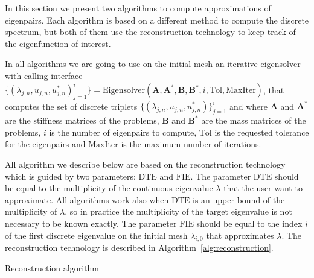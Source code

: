 \documentclass[smallextended]{svjour3}
\begin{document}
In this section we present two algorithms to compute approximations of eigenpairs. Each algorithm is based on a different method to compute the discrete spectrum, but both of them use the reconstruction technology to keep track of the eigenfunction of interest.

In all algorithms we are going to use on the initial mesh an iterative eigensolver with calling interface
$\{(\lambda_{j,n},u_{j,n},u_{j,n}^*)_{j=1}^{i}\}=\mathrm{Eigensolver}(\mathbf{A},
\mathbf{A}^*,\mathbf{B},\mathbf{B}^*,i,\mathrm{Tol},\mathrm{MaxIter})$, that computes the set of discrete triplets $\{(\lambda_{j,n},u_{j,n},u_{j,n}^*)\}_{j=1}^{i}$ and where $\mathbf{A}$ and $\mathbf{A}^*$ are the stiffness matrices of the problems, $\mathbf{B}$ and $\mathbf{B}^*$ are the mass matrices of the problems, $i$ is the number of eigenpairs to compute, $\mathrm{Tol}$ is the requested tolerance for the eigenpairs and $\mathrm{MaxIter}$ is the maximum number of iterations. 


All algorithm we describe below are based on the reconstruction technology which is guided by two parameters: $\mathrm{DTE}$ and $\mathrm{FIE}$. The parameter $\mathrm{DTE}$ should be equal to the multiplicity of the continuous eigenvalue $\lambda$ that the user want to approximate. All algorithms work also when $\mathrm{DTE}$ is an upper bound of the multiplicity of $\lambda$, so in practice the multiplicity of the target eigenvalue is not necessary to be known exactly. The parameter $\mathrm{FIE}$ should be equal to the index $i$ of the first discrete eigenvalue on the initial mesh $\lambda_{i,0}$ that approximates $\lambda$. The reconstruction technology is described in Algorithm~\eqref{alg:reconstruction}.

\begin{algorithm}[!ht] \caption{Reconstruction algorithm} \label{alg:reconstruction} 
\begin{algorithmic}





\end{algorithmic}
\end{algorithm}
\end{document}
